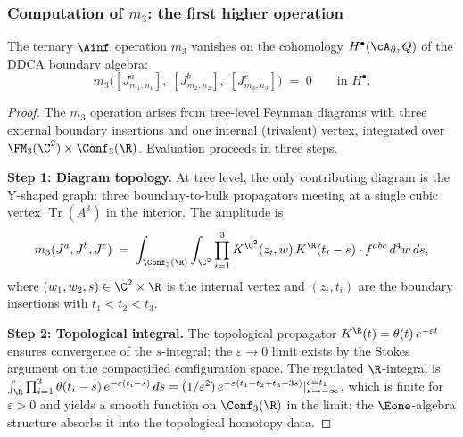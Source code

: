 \subsubsection{Computation of \texorpdfstring{$m_3$}{m3}: the first higher operation}

\begin{theorem}
\label{thm:DDCA-m3}
The ternary $\Ainf$ operation $m_3$ vanishes on the
cohomology $H^\bullet(\cA_\partial, Q)$ of the DDCA
boundary algebra:
\[
 m_3\bigl([J^a_{m_1,n_1}],\;
 [J^b_{m_2,n_2}],\;
 [J^c_{m_3,n_3}]\bigr)
 \;=\; 0
 \qquad
 \text{in } H^\bullet.
\]
\end{theorem}

\begin{proof}
The $m_3$ operation arises from tree-level Feynman
diagrams with three external boundary insertions and one
internal (trivalent) vertex, integrated over
$\FM_3(\C^2) \times \Conf_3(\R)$. Evaluation proceeds in three steps.

\medskip\noindent\textbf{Step 1: Diagram topology.}
At tree level, the only contributing diagram is the
Y-shaped graph: three boundary-to-bulk propagators
meeting at a single cubic vertex $\operatorname{Tr}(A^3)$ in
the interior. The amplitude is
\begin{equation}\label{eq:DDCA-m3-integral}
 m_3(J^a,J^b,J^c)
 \;=\;
 \int_{\Conf_3(\R)}
 \int_{\C^2}
 \prod_{i=1}^{3}
 K^{\C^2}(z_i, w)\,
 K^{\R}(t_i - s)
 \cdot
 f^{abc}\, d^4w\, ds,
\end{equation}
where $(w_1,w_2,s) \in \C^2 \times \R$ is the internal
vertex and $(z_i, t_i)$ are the boundary insertions with
$t_1 < t_2 < t_3$.

\medskip\noindent\textbf{Step 2: Topological integral.}
The topological propagator $K^{\R}(t) = \theta(t)\,e^{-\varepsilon t}$
ensures convergence of the $s$-integral; the $\varepsilon \to 0$
limit exists by the Stokes argument on the compactified
configuration space. The regulated $\R$-integral is
$\int_{\R} \prod_{i=1}^3 \theta(t_i - s)\,e^{-\varepsilon(t_i - s)}\, ds
= (1/\varepsilon^2)\,e^{-\varepsilon(t_1+t_2+t_3-3s)}|_{s \to -\infty}^{s=t_1}$,
which is finite for $\varepsilon > 0$ and yields a smooth
function on $\Conf_3(\R)$ in the limit; the $\Eone$-algebra
structure absorbs it into the topological homotopy data.


\end{proof}
